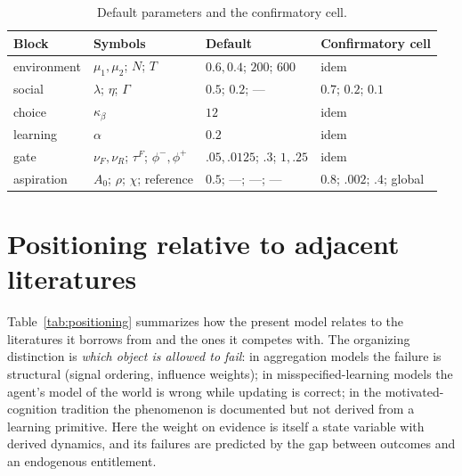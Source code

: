\documentclass[11pt]{article}
\newcommand{\1}{\mathbf{1}}
\begin{document}
\begin{table}[H]\centering\small
\caption{Default parameters and the confirmatory cell.}
\begin{tabular}{llll}
\toprule
Block & Symbols & Default & Confirmatory cell \\
\midrule
environment & $\mu_1,\mu_2$; $N$; $T$ & $0.6,0.4$; $200$; $600$ & idem \\
social & $\lambda$; $\eta$; $\Gamma$ & $0.5$; $0.2$; --- & $0.7$; $0.2$; $0.1$ \\
choice & $\kappa_\beta$ & $12$ & idem \\
learning & $\alpha$ & $0.2$ & idem \\
gate & $\nu_F,\nu_R$; $\tau^F$; $\phi^-,\phi^+$ & $.05,.0125$; $.3$; $1,.25$ & idem \\
aspiration & $A_0$; $\rho$; $\chi$; reference & $0.5$; ---; ---; --- & $0.8$; $.002$; $.4$; global \\
\bottomrule
\end{tabular}
\end{table}

\section{Positioning relative to adjacent literatures}
\label{s:positioning}

Table~\ref{tab:positioning} summarizes how the present model relates to the literatures it
borrows from and the ones it competes with. The organizing distinction is \emph{which object
is allowed to fail}: in aggregation models the failure is structural (signal ordering,
influence weights); in misspecified-learning models the agent's model of the world is wrong
while updating is correct; in the motivated-cognition tradition the phenomenon is documented
but not derived from a learning primitive. Here the weight on evidence is itself a state
variable with derived dynamics, and its failures are predicted by the gap between outcomes
and an endogenous entitlement.
\end{document}
